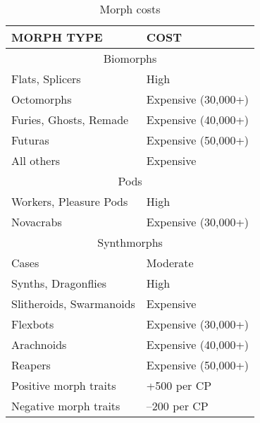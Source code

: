 \begin{table} \caption{Morph costs} \begin{tabular}{|l|l|} \hline

MORPH TYPE &COST \\ \hline

\multicolumn{2}{|c|}{Biomorphs} \\ \hline

Flats, Splicers &High \\ \hline

Octomorphs &Expensive (30,000+) \\ \hline

Furies, Ghosts, Remade &Expensive (40,000+) \\ \hline

Futuras &Expensive (50,000+) \\ \hline

All others &Expensive \\ \hline

\multicolumn{2}{|c|}{Pods} \\ \hline

Workers, Pleasure Pods &High \\ \hline

Novacrabs &Expensive (30,000+) \\ \hline

\multicolumn{2}{|c|}{Synthmorphs} \\ \hline

Cases &Moderate \\ \hline

Synths, Dragonflies &High \\ \hline

Slitheroids, Swarmanoids &Expensive \\ \hline

Flexbots &Expensive (30,000+) \\ \hline

Arachnoids &Expensive (40,000+) \\ \hline

Reapers &Expensive (50,000+) \\ \hline

Positive morph traits &+500 per CP \\ \hline

Negative morph traits &–200 per CP \\ \hline

\end{tabular} \label{table:morph-costs} \end{table} 



